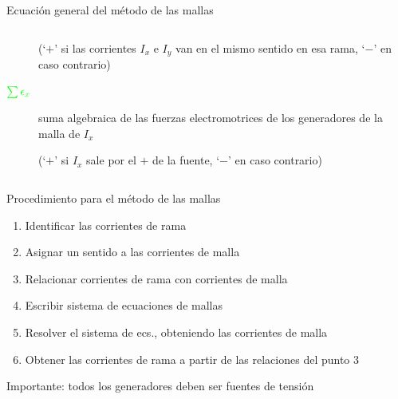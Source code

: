 \documentclass[aspectratio=169, xcolor={usenames,svgnames,dvipsnames}]{beamer}
\begin{document}
\begin{frame}{Ecuación general del método de las mallas}
\begin{columns}
\begin{column}{1.07\textwidth}
\begin{description}
        {\small (`$+$' si las corrientes \(I_x\) e \(I_y\) van en el mismo sentido en esa rama, `$-$' en caso contrario) }

        \vspace{2mm}
        
        \item[{\({\color{green}\sum \epsilon_x}\)}] suma algebraica de las fuerzas electromotrices de los generadores de la malla de \(I_x\) 
        
        {\small (`$+$' si $I_x$ sale por el $+$ de la fuente, `$-$' en caso contrario) }
        \end{description} 
    \end{column}
    \end{columns}
\end{frame}


\begin{frame}{Procedimiento para el método de las mallas}
    \begin{enumerate}
    \item Identificar las corrientes de rama
    \vspace{1mm}
    \item Asignar un sentido a las corrientes de malla
    \vspace{1mm}
    \item Relacionar corrientes de rama con corrientes de malla
    \vspace{1mm}
    \item Escribir sistema de ecuaciones de mallas
    \vspace{1mm}
    \item Resolver el sistema de ecs., obteniendo las corrientes de malla
    \vspace{1mm}
    \item Obtener las corrientes de rama a partir de las relaciones del punto 3
    \end{enumerate}

    \vspace{5mm}
    
    \hspace{7mm} \alert{Importante}: todos los generadores deben ser fuentes de tensión
\end{frame}

    
\end{document}
